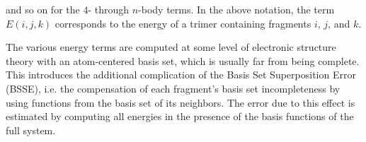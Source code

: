 \documentclass[11pt, proquest]{uwthesis}[2020/02/24]
\begin{document}
and so on for the $4$- through $n$-body terms. In the above notation, the term $E(i,j,k)$ corresponds to the energy of a trimer containing fragments $i$, $j$, and $k$.

\par The various energy terms are computed at some level of electronic structure theory with an atom-centered basis set, which is usually far from being complete. This introduces the additional complication of the Basis Set Superposition Error (BSSE), i.e. the compensation of each fragment’s basis set incompleteness by using functions from the basis set of its neighbors. The error due to this effect is estimated by computing all energies in the presence of the basis functions of the full system.\autocite{richard_understanding_2018,boys_calculation_1970,xantheas_importance_1996}
\end{document}
